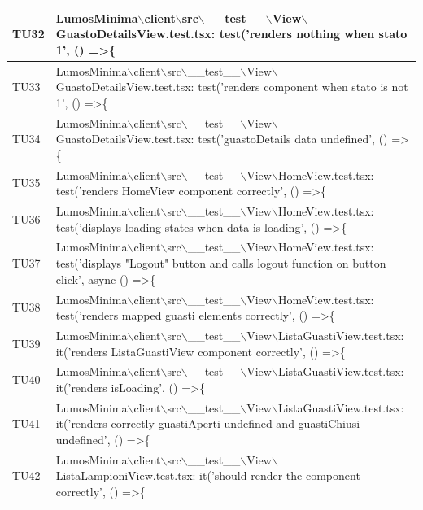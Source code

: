 \documentclass[12pt]{article}
\begin{document}
\begin{xltabular}{\linewidth}{|>{\hsize}X|X|}
	TU32 & LumosMinima$\backslash$client$\backslash$src$\backslash$\_\_test\_\_$\backslash$View$\backslash$GuastoDetailsView.test.tsx: test('renders nothing when stato 1', () =\textgreater \{ \\ \hline
	TU33 & LumosMinima$\backslash$client$\backslash$src$\backslash$\_\_test\_\_$\backslash$View$\backslash$GuastoDetailsView.test.tsx: test('renders component when stato is not 1', () =\textgreater \{ \\ \hline
	TU34 & LumosMinima$\backslash$client$\backslash$src$\backslash$\_\_test\_\_$\backslash$View$\backslash$GuastoDetailsView.test.tsx: test('guastoDetails data undefined', () =\textgreater \{ \\ \hline
	TU35 & LumosMinima$\backslash$client$\backslash$src$\backslash$\_\_test\_\_$\backslash$View$\backslash$HomeView.test.tsx: test('renders HomeView component correctly', () =\textgreater \{ \\ \hline
	TU36 & LumosMinima$\backslash$client$\backslash$src$\backslash$\_\_test\_\_$\backslash$View$\backslash$HomeView.test.tsx: test('displays loading states when data is loading', () =\textgreater \{ \\ \hline
	TU37 & LumosMinima$\backslash$client$\backslash$src$\backslash$\_\_test\_\_$\backslash$View$\backslash$HomeView.test.tsx: test('displays "Logout" button and calls logout function on button click', async () =\textgreater \{ \\ \hline
	TU38 & LumosMinima$\backslash$client$\backslash$src$\backslash$\_\_test\_\_$\backslash$View$\backslash$HomeView.test.tsx: test('renders mapped guasti elements correctly', () =\textgreater \{ \\ \hline
	TU39 & LumosMinima$\backslash$client$\backslash$src$\backslash$\_\_test\_\_$\backslash$View$\backslash$ListaGuastiView.test.tsx: it('renders ListaGuastiView component correctly', () =\textgreater \{ \\ \hline
	TU40 & LumosMinima$\backslash$client$\backslash$src$\backslash$\_\_test\_\_$\backslash$View$\backslash$ListaGuastiView.test.tsx: it('renders isLoading', () =\textgreater \{ \\ \hline
	TU41 & LumosMinima$\backslash$client$\backslash$src$\backslash$\_\_test\_\_$\backslash$View$\backslash$ListaGuastiView.test.tsx: it('renders correctly guastiAperti undefined and guastiChiusi undefined', () =\textgreater \{ \\ \hline
	TU42 & LumosMinima$\backslash$client$\backslash$src$\backslash$\_\_test\_\_$\backslash$View$\backslash$ListaLampioniView.test.tsx: it('should render the component correctly', () =\textgreater \{ \\ \hline

\end{xltabular}
\end{document}
